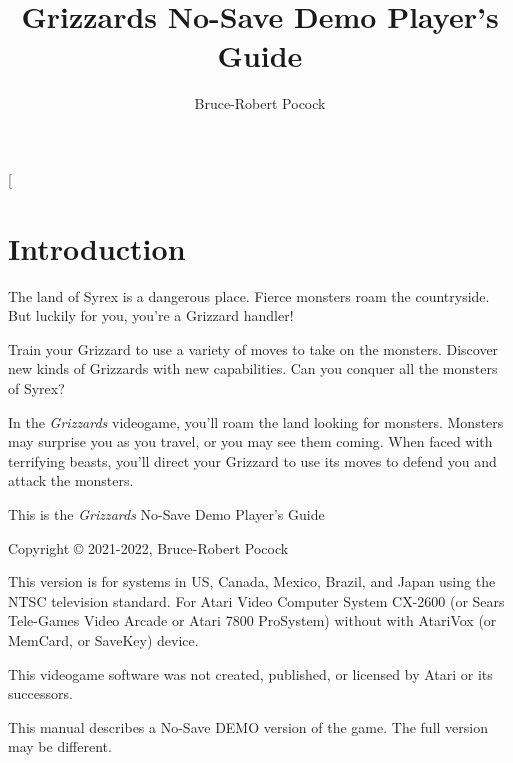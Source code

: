 \documentclass[10pt,twocolumn,openany,article]{memoir}
\title{Grizzards \ifdefined\NOSAVE No-Save \fi\ifdefined\DEMO Demo \fi Player's Guide}
\author{Bruce-Robert Pocock}
\newcommand\TV{NTSC}
\newcommand\REGION{US, Canada, Mexico, Brazil, and Japan}
\newcommand\TV{PAL}
\newcommand\REGION{UK and Europe (except France)}
\newcommand\TV{SECAM}
\newcommand\REGION{France, Russia, Africa}
\begin{document}
\frontmatter




\thispagestyle{empty}

\twocolumn[

\chapter*{Introduction}\label{Introduction}

The  land of  Syrex  is  a dangerous  place.  Fierce  monsters roam  the
countryside. But luckily for you, you're a Grizzard handler!

Train your Grizzard to  use a variety of moves to  take on the monsters.
Discover new kinds  of Grizzards with new capabilities.  Can you conquer
all the monsters of Syrex?

\bigskip

In the \textit{Grizzards}  videogame, you'll roam the land  looking for monsters.
Monsters may  surprise you as  you travel, or  you may see  them coming.
When faced  with terrifying beasts,  you'll direct your Grizzard  to use
its moves to defend you and attack the monsters.

\vspace{2in}\vfill

This is the \textit{Grizzards} \ifdefined\NOSAVE No-Save \fi\ifdefined\DEMO Demo \fi Player's Guide

Copyright \copyright{} 2021-2022, Bruce-Robert Pocock

\bigskip

This  version is  for systems  in \REGION{}  using the  \TV{} television
standard. For Atari  Video Computer System CX-2600  (or Sears Tele-Games
Video Arcade  or Atari  7800 ProSystem) \ifdefined\NOSAVE  without \else
with \fi AtariVox (or MemCard, or SaveKey) device.

\bigskip

This videogame software was not created, published, or licensed by Atari
or its successors.

\ifdefined\DEMO
\bigskip

This manual describes a \ifdefined\NOSAVE No-Save \fi DEMO version of the game. The full version may
be different.
\end{document}
